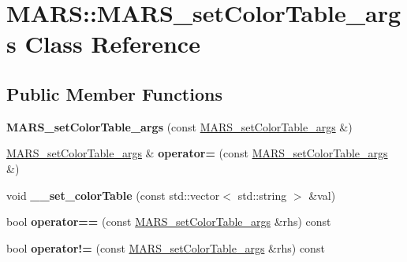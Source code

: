 \hypertarget{classMARS_1_1MARS__setColorTable__args}{}\section{M\+A\+RS\+:\+:M\+A\+R\+S\+\_\+set\+Color\+Table\+\_\+args Class Reference}
\label{classMARS_1_1MARS__setColorTable__args}
\subsection*{Public Member Functions}
\begin{DoxyCompactItemize}
\item 
\mbox{\label{classMARS_1_1MARS__setColorTable__args_aaa819aaec09feb306be25a174f69483d}} 
{\bfseries M\+A\+R\+S\+\_\+set\+Color\+Table\+\_\+args} (const \hyperlink{classMARS_1_1MARS__setColorTable__args}{M\+A\+R\+S\+\_\+set\+Color\+Table\+\_\+args} \&)
\item 
\mbox{\label{classMARS_1_1MARS__setColorTable__args_a9375bd24d2ebc323d35dcb372ff1ebf3}} 
\hyperlink{classMARS_1_1MARS__setColorTable__args}{M\+A\+R\+S\+\_\+set\+Color\+Table\+\_\+args} \& {\bfseries operator=} (const \hyperlink{classMARS_1_1MARS__setColorTable__args}{M\+A\+R\+S\+\_\+set\+Color\+Table\+\_\+args} \&)
\item 
\mbox{\label{classMARS_1_1MARS__setColorTable__args_a3df423ef74b50a369420cbad3b87d49f}} 
void {\bfseries \+\_\+\+\_\+set\+\_\+color\+Table} (const std\+::vector$<$ std\+::string $>$ \&val)
\item 
\mbox{\label{classMARS_1_1MARS__setColorTable__args_a0c83ce6e72e6ce274f6343550381663e}} 
bool {\bfseries operator==} (const \hyperlink{classMARS_1_1MARS__setColorTable__args}{M\+A\+R\+S\+\_\+set\+Color\+Table\+\_\+args} \&rhs) const
\item 
\mbox{\label{classMARS_1_1MARS__setColorTable__args_aba8f5fce91f464609e45b33ccf2e111f}} 
bool {\bfseries operator!=} (const \hyperlink{classMARS_1_1MARS__setColorTable__args}{M\+A\+R\+S\+\_\+set\+Color\+Table\+\_\+args} \&rhs) const

\end{DoxyCompactItemize}
